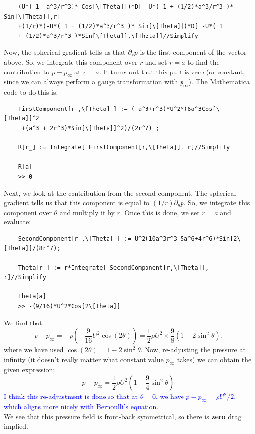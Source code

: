 \documentclass[11pt]{article}
\newcommand{\f}[2]{\frac{#1}{#2}}
\newcommand{\p}{\partial}%
\begin{document}
\begin{enumerate}[(a)]
\begin{lstlisting}
	(U*( 1 -a^3/r^3)* Cos[\[Theta]])*D[ -U*( 1 + (1/2)*a^3/r^3 )* Sin[\[Theta]],r]
	+(1/r)*(-U*( 1 + (1/2)*a^3/r^3 )* Sin[\[Theta]])*D[ -U*( 1 
	+ (1/2)*a^3/r^3 )*Sin[\[Theta]],\[Theta]]//Simplify
	\end{lstlisting}
	
	Now, the spherical gradient tells us that $\p_r p$ is the first component of the vector above. So, we integrate this component over $r$ and set $r=a$ to find the contribution to $p-p_\infty$ at $r=a$. It turns out that this part is zero (or constant, since we can always perform a gauge transformation with $p_\infty$). The Mathematica code to do this is:
	\begin{lstlisting}
	FirstComponent[r_,\[Theta]_] := (-a^3+r^3)*U^2*(6a^3Cos[\[Theta]]^2
	 +(a^3 + 2r^3)*Sin[\[Theta]]^2)/(2r^7) ;
	
	R[r_] := Integrate[ FirstComponent[r,\[Theta]], r]//Simplify
	
	R[a]
	>> 0
	\end{lstlisting}
	
	
	
	Next, we look at the contribution from the second component. The spherical gradient tells us that this component is equal to $(1/r)\p_\theta p$. So, we integrate this component over $\theta$ and multiply it by $r$. Once this is done, we set $r=a$ and evaluate:
	
	\begin{lstlisting}
	SecondComponent[r_,\[Theta]_] := U^2(10a^3r^3-5a^6+4r^6)*Sin[2\[Theta]]/(8r^7);
	
	Theta[r_] := r*Integrate[ SecondComponent[r,\[Theta]], r]//Simplify
	
	Theta[a]
	>> -(9/16)*U^2*Cos[2\[Theta]]
	\end{lstlisting}
	
	We find that 
	\begin{equation*}
	p-p_\infty = -\rho \left( -\f{9}{16} U^2 \cos(2\theta) \right) = \f{1}{2} \rho U^2 \times \f{9}{8}\left(1 -2\sin^2\theta \right).
	\end{equation*}
	where we have used $\cos(2\theta) = 1 - 2\sin^2\theta$. Now, re-adjusting the pressure at infinity (it doesn't really matter what constant value $p_\infty$ takes) we can obtain the given expression:
	\begin{equation*}
	\boxed{p - p_\infty = \f{1}{2}\rho U^2 \left( 1- \f{9}{4}\sin^2\theta \right)}
	\end{equation*}
	\textcolor{blue}{I think this re-adjustment is done so that at $\theta =0$, we have $p-p_\infty = \rho U^2/2$, which aligns more nicely with Bernoulli's equation.}\\
	
	
	We see that this pressure field is front-back symmetrical, so there is \textbf{zero} drag implied.  
	

\end{enumerate}
\end{document}
